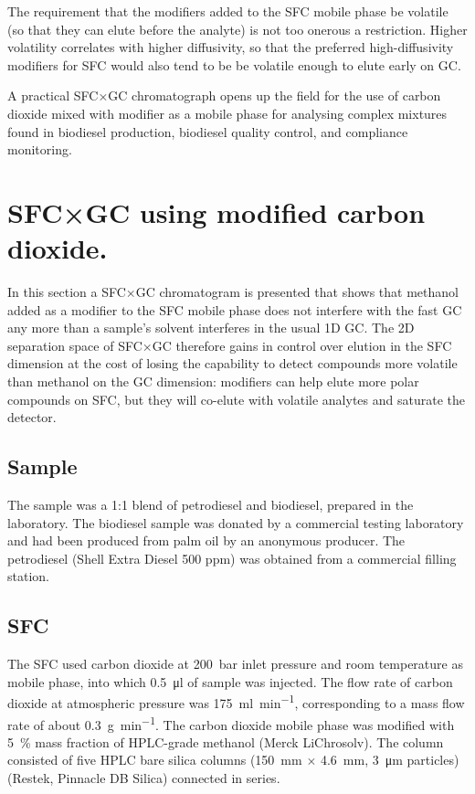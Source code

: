 The requirement that the modifiers added to the SFC mobile phase be volatile (so
that they can elute before the analyte) is not too onerous a restriction. Higher
volatility correlates with higher diffusivity, so that the preferred
high-diffusivity modifiers for SFC  would also tend to be be volatile enough to
elute early on GC. 

A practical SFC×GC chromatograph opens up the field for the use of carbon
dioxide mixed with modifier as a mobile phase for analysing complex mixtures
found in biodiesel production, biodiesel quality control, and compliance
monitoring.

\section[SFC×GC with modifier]{SFC×GC using modified carbon dioxide.}

In this section a SFC×GC chromatogram is presented that shows that methanol
added as a modifier to the SFC mobile phase does not interfere with the fast GC
any more than a sample's solvent interferes in the usual 1D GC. The 2D
separation space of SFC×GC therefore gains in control over elution in the SFC
dimension at the cost of losing the capability to detect compounds more volatile
than methanol on the GC dimension: modifiers can help elute more polar compounds
on SFC, but they will co-elute with volatile analytes and saturate the detector.

\subsection{Sample}

The sample was a 1:1 blend of petrodiesel and biodiesel, prepared in the
laboratory. The biodiesel sample was donated by a commercial testing laboratory
and had been produced from palm oil by an anonymous producer. The petrodiesel
(Shell Extra Diesel 500 ppm) was obtained from a commercial filling station.

\subsection{SFC}

The SFC used carbon dioxide at \SI{200}{\bar} inlet pressure and room
temperature as mobile phase, into which \SI{0.5}{\micro\litre} of sample was
injected. The flow rate of carbon dioxide at atmospheric pressure was
\SI{175}{\milli\litre\per\minute}, corresponding to a mass flow rate of about
\SI{0.3}{\gram\per\minute}. The carbon dioxide mobile phase was modified with
\SI{5}{\percent} mass fraction of HPLC-grade methanol (Merck LiChrosolv).
The column consisted of five HPLC bare silica columns (\SI{150}{\milli\metre}
$\times$ \SI{4.6}{\milli\metre}, \SI{3}{\micro\metre} particles) (Restek,
Pinnacle DB Silica) connected in series.

